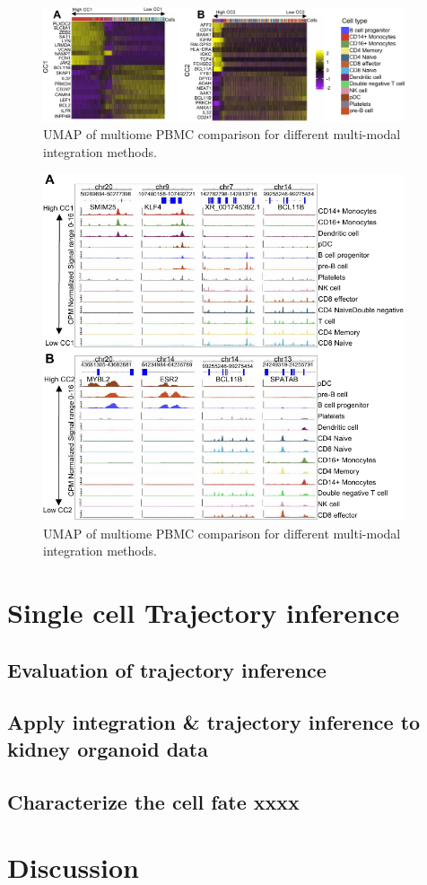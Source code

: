 \begin{figure}[!ht]
	\centering
	\includegraphics[width=0.95\textwidth]{CC_Genes/fig}
	\vspace{0.1cm}
	\caption[UMAP of multiome PBMC comparison for different multi-modal integration methods.]{UMAP of multiome PBMC comparison for different multi-modal integration methods.}
	\label{fig:CC_Genes}
\end{figure}



\begin{figure}[!ht]
	\centering
	\includegraphics[width=0.95\textwidth]{CC_Peaks/fig}
	\vspace{0.1cm}
	\caption[UMAP of multiome PBMC comparison for different multi-modal integration methods.]{UMAP of multiome PBMC comparison for different multi-modal integration methods.}
	\label{fig:CC_Peaks}
\end{figure}



\section{Single cell Trajectory inference}
\subsection{Evaluation of trajectory inference}
\subsection{Apply integration \& trajectory inference to kidney organoid data}
\subsection{Characterize the cell fate xxxx}

\section{Discussion}

